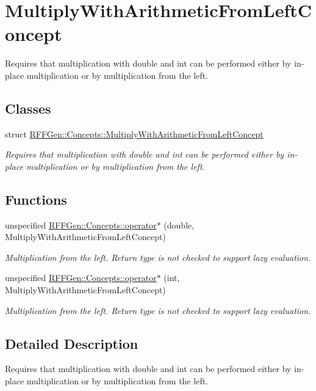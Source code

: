 \hypertarget{group__MultiplyWithArithmeticFromLeftConcept}{\section{Multiply\-With\-Arithmetic\-From\-Left\-Concept}
\label{group__MultiplyWithArithmeticFromLeftConcept}
}


Requires that multiplication with double and int can be performed either by in-\/place multiplication or by multiplication from the left.  


\subsection*{Classes}
\begin{DoxyCompactItemize}
\item 
struct \hyperlink{structRFFGen_1_1Concepts_1_1MultiplyWithArithmeticFromLeftConcept}{R\-F\-F\-Gen\-::\-Concepts\-::\-Multiply\-With\-Arithmetic\-From\-Left\-Concept}
\begin{DoxyCompactList}\small\item\em Requires that multiplication with double and int can be performed either by in-\/place multiplication or by multiplication from the left. \end{DoxyCompactList}\end{DoxyCompactItemize}
\subsection*{Functions}
\begin{DoxyCompactItemize}
\item 
\hypertarget{group__MultiplyWithArithmeticFromLeftConcept_ga8da9a0d637544b02ae5a40a03e445584}{unspecified \hyperlink{group__MultiplyWithArithmeticFromLeftConcept_ga8da9a0d637544b02ae5a40a03e445584}{R\-F\-F\-Gen\-::\-Concepts\-::operator$\ast$} (double, Multiply\-With\-Arithmetic\-From\-Left\-Concept)}\label{group__MultiplyWithArithmeticFromLeftConcept_ga8da9a0d637544b02ae5a40a03e445584}

\begin{DoxyCompactList}\small\item\em Multiplication from the left. Return type is not checked to support lazy evaluation. \end{DoxyCompactList}\item 
\hypertarget{group__MultiplyWithArithmeticFromLeftConcept_gab8bd740daf219fda12c9c9ecbadfc420}{unspecified \hyperlink{group__MultiplyWithArithmeticFromLeftConcept_gab8bd740daf219fda12c9c9ecbadfc420}{R\-F\-F\-Gen\-::\-Concepts\-::operator$\ast$} (int, Multiply\-With\-Arithmetic\-From\-Left\-Concept)}\label{group__MultiplyWithArithmeticFromLeftConcept_gab8bd740daf219fda12c9c9ecbadfc420}

\begin{DoxyCompactList}\small\item\em Multiplication from the left. Return type is not checked to support lazy evaluation. \end{DoxyCompactList}\end{DoxyCompactItemize}


\subsection{Detailed Description}
Requires that multiplication with double and int can be performed either by in-\/place multiplication or by multiplication from the left. 